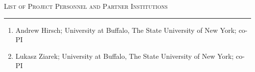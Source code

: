 



\begin{center}
{\LARGE
\textsc{List of Project Personnel and Partner Institutions}
}
\end{center}
\hrule

\vspace{3mm}


\begin{enumerate}
\item Andrew Hirsch; University at Buffalo, The State University of New York; co-PI
\item Lukasz Ziarek; University at Buffalo, The State University of New York; co-PI

\end{enumerate}


